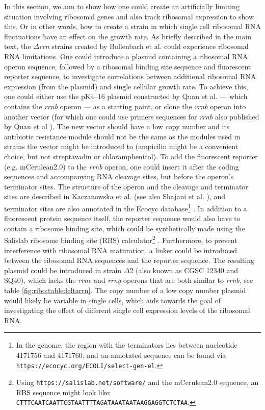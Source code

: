 In this section, we aim to show how one could create an artificially limiting situation involving ribosomal genes and also track ribosomal expression to show this. 
Or in other words, how to create a strain in which single cell ribosomal RNA fluctuations have an effect on the growth rate. 
%
%
As briefly described in the main text, the $\Delta$\textit{rrn} strains created by Bollenbach et al. \cite{Bollenbach2009} could experience ribosomal RNA limitations.
%
One could introduce a plasmid containing a ribosomal RNA operon sequence, followed by a ribosomal binding site sequence and fluorescent reporter sequence, 
to investigate correlations between additional ribosomal RNA expression (from the plasmid) and single cellular growth rate.
%
To achieve this, one could either use the pK4--16 plasmid constructed by Quan et al. \cite{Quan2013} --- which contains the \textit{rrnb} operon --- as a starting point, or clone the \textit{rrnb} operon into another vector (for which one could use primers sequences for \textit{rrnb} also published by Quan et al \cite{Quan2013}).
%
The new vector should have a low copy number and its antibiotic resistance module should not be the same as the modules used in strains the vector might be introduced to (ampicilin might be a convenient choice, but not streptavadin or chloramphenicol).
%
To add the fluorescent reporter (e.g. mCerulean2.0) to the \textit{rrnb} operon, one could insert it after the coding sequences and accompanying RNA cleavage sites, but before the operon's terminator sites.
%
The structure of the operon and the cleavage and terminator sites are described in Kaczanowska et al. \cite{Kaczanowska2007} (see also Shajani et al. \cite{Shajani2011}),
%
and terminator sites are also annotated in the Ecocyc database\footnote{In the \ecoli genome, the region with the terminators lies between nucleotide 4171756 and 4171760, and an annotated sequence can be found via \texttt{https://ecocyc.org/ECOLI/select-gen-el}.} \cite{Keseler2017}.
%
In addition to a fluorescent protein sequence itself, the reporter sequence would also have to contain a ribosome binding site, which could be synthetically made using the Salislab ribosome binding site (RBS) calculator\footnote{Using \texttt{https://salislab.net/software/} and the mCerulean2.0 sequence, an RBS sequence might look like: \newline\texttt{CTTTCAATCAATTCGTAATTTTAGATAAATAATAAGGAGGTCTCTAA}.} \cite{Salis2009, Salis2011}. 
Furthermore, to prevent interference with ribosomal RNA maturation, a linker could be introduced between the ribosomal RNA sequences and the reporter sequence.
%
The resulting plasmid could be introduced in strain $\Delta$2 (also known as CGSC 12340 and SQ40), which lacks the \textit{rrne} and \textit{rrng} operons that are both similar to \textit{rrnb}, see table \ref{fig:ribo:tabledeltarrn}.
%
The copy number of a low copy number plasmid would likely be variable in single cells, which aids towards the goal of investigating the effect of different single cell expression levels of the ribosomal RNA.

